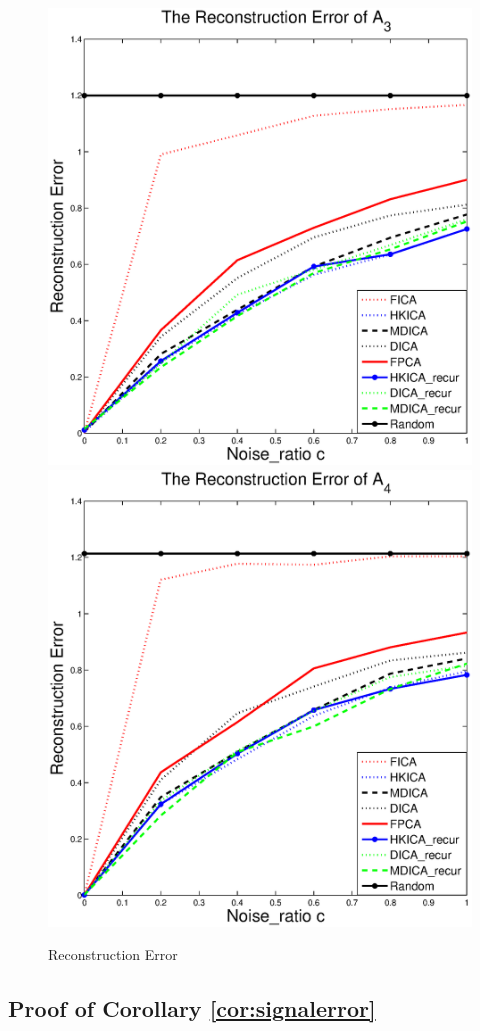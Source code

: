 \begin{figure}[t]
	\includegraphics[width =0.49\columnwidth]{error3_d3} \medskip \\
	\includegraphics[width =0.49\columnwidth]{error4_d3}
\vspace{-0.5cm}
\caption{
\label{fig:Error_d3}
 Reconstruction Error}
\end{figure}

\subsection{Proof of Corollary \ref{cor:signalerror}}

